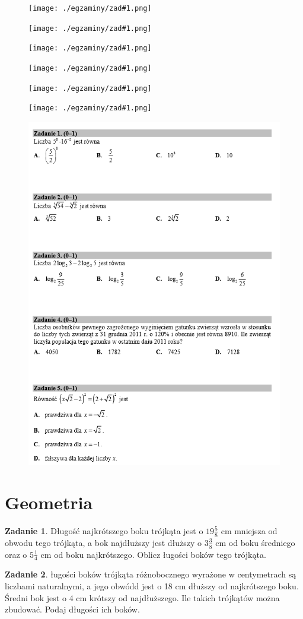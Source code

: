 \documentclass[11pt]{article}
\theoremstyle{definition}
\newtheorem{zad}{Zadanie}
\numberwithin{zad}{section}
\begin{document}



\renewcommand\cke[1]{

\begin{figure}[H]
\centering
\texttt{[image: ./egzaminy/zad\#1.png]}
\end{figure}

}

\cke{17}
\cke{18}
\cke{19}
\cke{20}
\cke{21}
\cke{22}

\begin{figure}[H]
\centering
\includegraphics[width=0.7\linewidth]{./egzaminy/mat1.png}
\end{figure}

\section{Geometria}

\begin{zad}
Długość najkrótszego boku trójkąta jest o $19\frac58$ cm mniejsza od obwodu tego trójkąta, a bok najdłuższy jest dłuższy o $3\frac38$ cm od boku średniego oraz o $5\frac14$ cm od boku najkrótszego. Oblicz ługości boków tego trójkąta.
\end{zad}

\begin{zad}
ługości boków trójkąta różnobocznego wyrażone w centymetrach są liczbami naturalnymi, a jego obwódd jest o 18 cm dłuższy od najkrótszego boku. Średni bok jest o 4 cm krótszy od najdłuższego. Ile takich trójkątów można zbudować. Podaj długości ich boków.
\end{zad}
\end{document}

